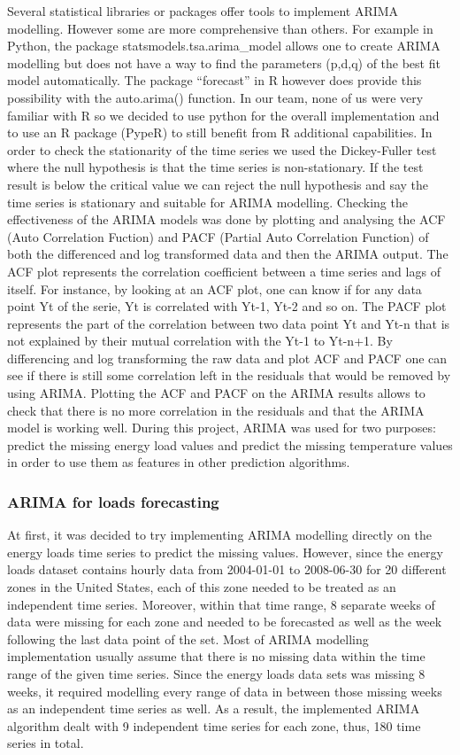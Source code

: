 \documentclass{article} %
\begin{document}
Several statistical libraries or packages offer tools to implement ARIMA modelling. However some are more comprehensive than others. For example in Python, the package statsmodels.tsa.arima_model allows one to create ARIMA modelling but does not have a way to find the parameters (p,d,q) of the best fit model automatically. The package “forecast” in R however does provide this possibility with the auto.arima() function. 
In our team, none of us were very familiar with R so we decided to use python for the overall implementation and to use an R package (PypeR) to still benefit from R additional capabilities. 
In order to check the stationarity of the time series we used the Dickey-Fuller test where the null hypothesis is that the time series is non-stationary. If the test result is below the critical value we can reject the null hypothesis and say the time series is stationary and suitable for ARIMA modelling.
Checking the effectiveness of the ARIMA models was done by plotting and analysing the ACF (Auto Correlation Fuction) and PACF (Partial Auto Correlation Function) of both the differenced and log transformed data and then the ARIMA output. 
The ACF plot represents the correlation coefficient between a time series and lags of itself. For instance, by looking at an ACF plot, one can know if for any data point Yt of the serie, Yt is correlated with Yt-1, Yt-2 and so on.
The PACF plot represents the part of the correlation between two data point Yt and Yt-n that is not explained by their mutual correlation with the Yt-1 to Yt-n+1. 
By differencing and log transforming the raw data and plot ACF and PACF one can see if there is still some correlation left in the residuals that would be removed by using ARIMA. Plotting the ACF and PACF on the ARIMA results allows to check that there is no more correlation in the residuals and that the ARIMA model is working well.
During this project, ARIMA was used for two purposes: predict the missing energy load values and predict the missing temperature values in order to use them as features in other prediction algorithms. 

\subsubsection*{ARIMA for loads forecasting}

At first, it was decided to try implementing ARIMA modelling directly on the energy loads time series to predict the missing values. 
However, since the energy loads dataset contains hourly data from 2004-01-01 to 2008-06-30 for 20 different zones in the United States, each of this zone needed to be treated as an independent time series. Moreover, within that time range, 8 separate weeks of data were missing for each zone and needed to be forecasted as well as the week following the last data point of the set.
Most of ARIMA modelling implementation usually assume that there is no missing data within the time range of the given time series. Since the energy loads data sets was missing 8 weeks, it required modelling every range of data in between those missing weeks as an independent time series as well.
As a result, the implemented ARIMA algorithm dealt with 9 independent time series for each zone, thus, 180 time series in total.
\end{document}
